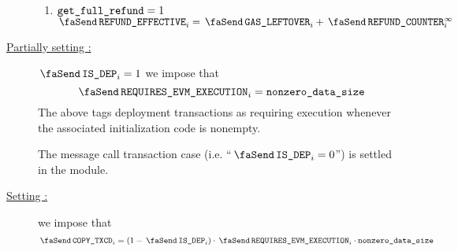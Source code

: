 \begin{description}
\begin{enumerate}
                        \item \If $\texttt{get\_full\_refund} = 1$ \Then $\txEffectiveRefund _{i} = \txLeftoverGas _{i} + \txFinalRefundCounter _{i}$
                \end{enumerate}
        \item[\underline{Partially setting \txRequiresEvmExecution{}:}]
                \If $\txIsDeployment_{i} = 1$ \Then we impose that
                \[
                        \txRequiresEvmExecution_{i} = \locNonzeroDataSize
                \]
                \saNote{} The above tags deployment transactions as requiring \evm{} execution whenever the associated initialization code is nonempty.

                \saNote{} The message call transaction case (i.e. ``$\txIsDeployment_{i} = 0$'') is settled in the \hubMod{} module.
        \item[\underline{Setting \txCopyTxcd{}:}]
                we impose that
                \[
                        \txCopyTxcd_{i} = (1 - \txIsDeployment_{i}) \cdot \txRequiresEvmExecution_{i} \cdot \locNonzeroDataSize
                \]
\end{description}

